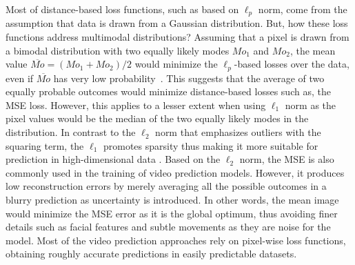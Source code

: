 Most of distance-based loss functions, such as based on $\ell_p$ norm, come from the assumption that data is drawn from a Gaussian distribution. But, how these loss functions address multimodal distributions? Assuming that a pixel is drawn from a bimodal distribution with two equally likely modes $Mo_1$ and $Mo_2$, the mean value ${\overline{Mo}=(Mo_1 + Mo_2)/2}$ would minimize the $\ell_p$-based losses over the data, even if $\overline{Mo}$ has very low probability~\cite{Mathieu2016}. This suggests that the average of two equally probable outcomes would minimize distance-based losses such as, the \ac{MSE} loss. However, this applies to a lesser extent when using $\ell_1$ norm as the pixel values would be the median of the two equally likely modes in the distribution. In contrast to the $\ell_2$ norm that emphasizes outliers with the squaring term, the $\ell_1$ promotes sparsity thus making it more suitable for prediction in high-dimensional data \cite{Mathieu2016}. Based on the $\ell_2$ norm, the \ac{MSE} is also commonly used in the training of video prediction models. However, it produces low reconstruction errors by merely averaging all the possible outcomes in a blurry prediction as uncertainty is introduced. In other words, the mean image would minimize the \ac{MSE} error as it is the global optimum, thus avoiding finer details such as facial features and subtle movements as they are noise for the model. Most of the video prediction approaches rely on pixel-wise loss functions, obtaining roughly accurate predictions in easily predictable datasets.

